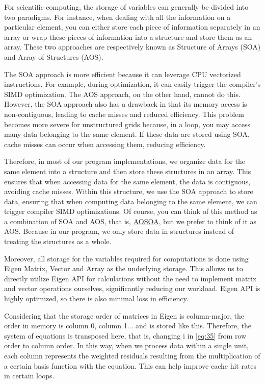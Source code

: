 \documentclass{develop-note}
\begin{document}

For scientific computing, the storage of variables can generally be divided into two paradigms. For instance, when dealing with all the information on a particular element, you can either store each piece of information separately in an array or wrap these pieces of information into a structure and store them as an array. These two approaches are respectively known as Structure of Arrays (SOA) and Array of Structures (AOS).

The SOA approach is more efficient because it can leverage CPU vectorized instructions. For example, during optimization, it can easily trigger the compiler's SIMD optimization. The AOS approach, on the other hand, cannot do this. However, the SOA approach also has a drawback in that its memory access is non-contiguous, leading to cache misses and reduced efficiency. This problem becomes more severe for unstructured grids because, in a loop, you may access many data belonging to the same element. If these data are stored using SOA, cache misses can occur when accessing them, reducing efficiency.

Therefore, in most of our program implementations, we organize data for the same element into a structure and then store these structures in an array. This ensures that when accessing data for the same element, the data is contiguous, avoiding cache misses. Within this structure, we use the SOA approach to store data, ensuring that when computing data belonging to the same element, we can trigger compiler SIMD optimizations. Of course, you can think of this method as a combination of SOA and AOS, that is, \href{https://en.wikipedia.org/wiki/AoS_and_SoA}{AOSOA}, but we prefer to think of it as AOS. Because in our program, we only store data in structures instead of treating the structures as a whole.

Moreover, all storage for the variables required for computations is done using Eigen Matrix, Vector and Array as the underlying storage. This allows us to directly utilize Eigen API for calculations without the need to implement matrix and vector operations ourselves, significantly reducing our workload. Eigen API is highly optimized, so there is also minimal loss in efficiency.

Considering that the storage order of matrices in Eigen is column-major, the order in memory is column 0, column 1... and is stored like this. Therefore, the system of equations is transposed here, that is, changing i in \autoref{eq:35} from row order to column order. In this way, when we process data within a single unit, each column represents the weighted residuals resulting from the multiplication of a certain basis function with the equation. This can help improve cache hit rates in certain loops.
\end{document}
